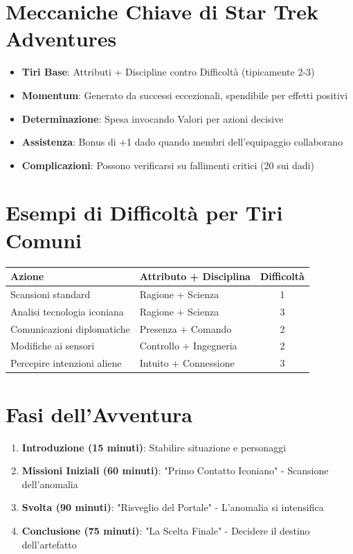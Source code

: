 \documentclass[11pt,a4paper]{article}
\begin{document}
\section{Meccaniche Chiave di Star Trek Adventures}

\begin{tcolorbox}[colback=fedlightblue!10, colframe=fedblue]
\begin{itemize}[leftmargin=*]
\item \textbf{Tiri Base}: Attributi + Discipline contro Difficoltà (tipicamente 2-3)
\item \textbf{Momentum}: Generato da successi eccezionali, spendibile per effetti positivi
\item \textbf{Determinazione}: Spesa invocando Valori per azioni decisive
\item \textbf{Assistenza}: Bonus di +1 dado quando membri dell'equipaggio collaborano
\item \textbf{Complicazioni}: Possono verificarsi su fallimenti critici (20 sui dadi)
\end{itemize}
\end{tcolorbox}

\section{Esempi di Difficoltà per Tiri Comuni}

\begin{tabularx}{\textwidth}{|l|X|c|}
\hline
\rowcolor{fedblue!20} \textbf{Azione} & \textbf{Attributo + Disciplina} & \textbf{Difficoltà} \\
\hline
Scansioni standard & Ragione + Scienza & 1 \\
\hline
Analisi tecnologia iconiana & Ragione + Scienza & 3 \\
\hline
Comunicazioni diplomatiche & Presenza + Comando & 2 \\
\hline
Modifiche ai sensori & Controllo + Ingegneria & 2 \\
\hline
Percepire intenzioni aliene & Intuito + Connessione & 3 \\
\hline
\end{tabularx}

\section{Fasi dell'Avventura}

\begin{tcolorbox}[colback=fedlightblue!10, colframe=fedblue]
\begin{enumerate}[leftmargin=*]
\item \textbf{Introduzione (15 minuti)}: Stabilire situazione e personaggi
\item \textbf{Missioni Iniziali (60 minuti)}: "Primo Contatto Iconiano" - Scansione dell'anomalia
\item \textbf{Svolta (90 minuti)}: "Risveglio del Portale" - L'anomalia si intensifica
\item \textbf{Conclusione (75 minuti)}: "La Scelta Finale" - Decidere il destino dell'artefatto
\end{enumerate}
\end{tcolorbox}
\end{document}
